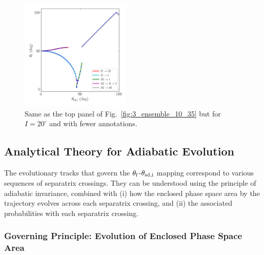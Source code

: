 \begin{figure}
    \centering
    \includegraphics[width=0.47\textwidth]{plots_diskdisp/3_ensemble_20_35.png}
    \caption{Same as the top panel of Fig.~\ref{fig:3_ensemble_10_35} but for $I
    = 20^\circ$ and with fewer annotations.}\label{fig:3_ensemble_20_35}
\end{figure}

\subsection{Analytical Theory for Adiabatic Evolution}\label{ss:zone_transitions}

The evolutionary tracks that govern the $\theta_{\rm f}$-$\theta_{\rm sd, i}$
mapping correspond to various sequences of separatrix crossings. They can be
understood using the principle of adiabatic invariance, combined with (i) how
the enclosed phase space area by the trajectory evolves across each separatrix
crossing, and (ii) the associated probabilities with each separatrix crossing.

\subsubsection{Governing Principle: Evolution of Enclosed Phase Space
Area}\label{sss:a_evo}


